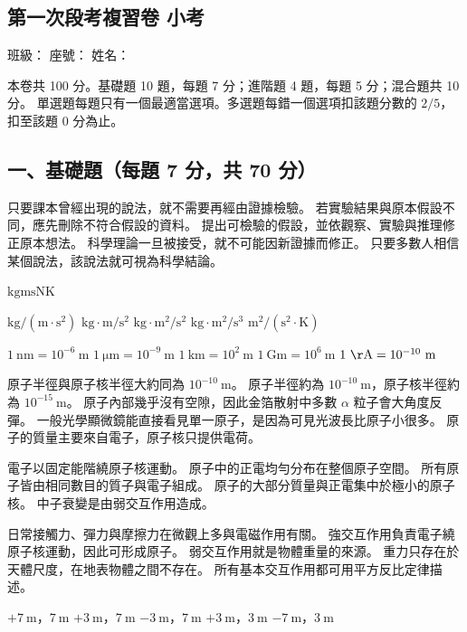\documentclass[10pt,a4paper]{article}
\newcommand{\examheader}{
    \begin{center}
        \section*{第一次段考複習卷 小考}
    \end{center}
}
\newcommand{\examinfo}{
\noindent \hspace*{\fill} \large 班級：\underline{\hspace{1.5cm}} 座號：\underline{\hspace{1cm}} 姓名：\underline{\hspace{2.5cm}}
\vspace{0.8em}

\begin{tcolorbox}[colframe=black, colback=white, arc=2mm]
\small
本卷共 100 分。基礎題 10 題，每題 7 分；進階題 4 題，每題 5 分；混合題共 10 分。
單選題每題只有一個最適當選項。多選題每錯一個選項扣該題分數的 $2/5$，扣至該題 0 分為止。
\end{tcolorbox}
}
\begin{document}
\examheader
\examinfo

\subsection*{一、基礎題（每題 7 分，共 70 分）}

{只要課本曾經出現的說法，就不需要再經由證據檢驗。}
{若實驗結果與原本假設不同，應先刪除不符合假設的資料。}
{提出可檢驗的假設，並依觀察、實驗與推理修正原本想法。}
{科學理論一旦被接受，就不可能因新證據而修正。}
{只要多數人相信某個說法，該說法就可視為科學結論。}

{$\mathrm{kg}$}{$\mathrm{m}$}{$\mathrm{s}$}{$\mathrm{N}$}{$\mathrm{K}$}

{$\mathrm{kg}/(\mathrm{m}\cdot\mathrm{s}^2)$}
{$\mathrm{kg}\cdot\mathrm{m}/\mathrm{s}^2$}
{$\mathrm{kg}\cdot\mathrm{m}^2/\mathrm{s}^2$}
{$\mathrm{kg}\cdot\mathrm{m}^2/\mathrm{s}^3$}
{$\mathrm{m}^2/(\mathrm{s}^2\cdot\mathrm{K})$}

{$1\ \mathrm{nm}=10^{-6}\ \mathrm{m}$}
{$1\ \mathrm{\mu m}=10^{-9}\ \mathrm{m}$}
{$1\ \mathrm{km}=10^2\ \mathrm{m}$}
{$1\ \mathrm{Gm}=10^6\ \mathrm{m}$}
{$1\ \mathrm{\AA}=10^{-10}\ \mathrm{m}$}

{原子半徑與原子核半徑大約同為 $10^{-10}\ \mathrm{m}$。}
{原子半徑約為 $10^{-10}\ \mathrm{m}$，原子核半徑約為 $10^{-15}\ \mathrm{m}$。}
{原子內部幾乎沒有空隙，因此金箔散射中多數 $\alpha$ 粒子會大角度反彈。}
{一般光學顯微鏡能直接看見單一原子，是因為可見光波長比原子小很多。}
{原子的質量主要來自電子，原子核只提供電荷。}

{電子以固定能階繞原子核運動。}
{原子中的正電均勻分布在整個原子空間。}
{所有原子皆由相同數目的質子與電子組成。}
{原子的大部分質量與正電集中於極小的原子核。}
{中子衰變是由弱交互作用造成。}

{日常接觸力、彈力與摩擦力在微觀上多與電磁作用有關。}
{強交互作用負責電子繞原子核運動，因此可形成原子。}
{弱交互作用就是物體重量的來源。}
{重力只存在於天體尺度，在地表物體之間不存在。}
{所有基本交互作用都可用平方反比定律描述。}

{$+7\ \mathrm{m}$，$7\ \mathrm{m}$}
{$+3\ \mathrm{m}$，$7\ \mathrm{m}$}
{$-3\ \mathrm{m}$，$7\ \mathrm{m}$}
{$+3\ \mathrm{m}$，$3\ \mathrm{m}$}
{$-7\ \mathrm{m}$，$3\ \mathrm{m}$}
\end{document}
